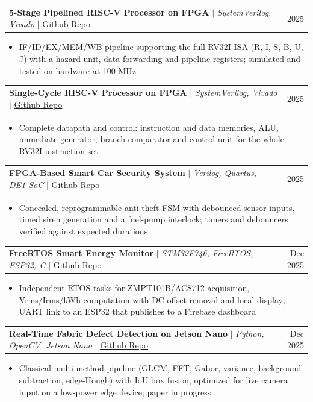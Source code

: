 \documentclass[letterpaper,11pt]{article}
\makeatletter
\newcommand{\resumeItem}[1]{
  \item\small{
    {#1 \vspace{-2pt}}
  }
}
\newcommand{\resumeProjectHeading}[2]{
    \item
    \begin{tabular*}{0.97\textwidth}{l@{\extracolsep{\fill}}r}
      \small#1 & #2 \\
    \end{tabular*}\vspace{-7pt}
}
\newcommand{\resumeItemListStart}{\begin{itemize}}
\newcommand{\resumeItemListEnd}{\end{itemize}\vspace{-5pt}}
\makeatother
\begin{document}
      \resumeProjectHeading
          {\textbf{5-Stage Pipelined RISC-V Processor on FPGA} $|$ \emph{SystemVerilog, Vivado} $|$ \href{https://github.com/Awais-Asghar/5-Stage-Pipelined-RISC-V-Processor-on-FPGA}{\underline{Github Repo}}}{2025}
          \resumeItemListStart
            \resumeItem{IF/ID/EX/MEM/WB pipeline supporting the full RV32I ISA (R, I, S, B, U, J) with a hazard unit, data forwarding and pipeline registers; simulated and tested on hardware at 100 MHz}
          \resumeItemListEnd

      \resumeProjectHeading
          {\textbf{Single-Cycle RISC-V Processor on FPGA} $|$ \emph{SystemVerilog, Vivado} $|$ \href{https://github.com/Awais-Asghar/Single-Cycle-RISC-V-Processor-Implemented-on-FPGA}{\underline{Github Repo}}}{2025}
          \resumeItemListStart
            \resumeItem{Complete datapath and control: instruction and data memories, ALU, immediate generator, branch comparator and control unit for the whole RV32I instruction set}
          \resumeItemListEnd

      \resumeProjectHeading
          {\textbf{FPGA-Based Smart Car Security System} $|$ \emph{Verilog, Quartus, DE1-SoC} $|$ \href{https://github.com/Awais-Asghar/FPGA-Based-Smart-Car-Security-System}{\underline{Github Repo}}}{2025}
          \resumeItemListStart
            \resumeItem{Concealed, reprogrammable anti-theft FSM with debounced sensor inputs, timed siren generation and a fuel-pump interlock; timers and debouncers verified against expected durations}
          \resumeItemListEnd

      \resumeProjectHeading
          {\textbf{FreeRTOS Smart Energy Monitor} $|$ \emph{STM32F746, FreeRTOS, ESP32, C} $|$ \href{https://github.com/Awais-Asghar/FreeRTOS-Based-Smart-Energy-Monitor-using-STM32}{\underline{Github Repo}}}{Dec 2025}
          \resumeItemListStart
            \resumeItem{Independent RTOS tasks for ZMPT101B/ACS712 acquisition, Vrms/Irms/kWh computation with DC-offset removal and local display; UART link to an ESP32 that publishes to a Firebase dashboard}
          \resumeItemListEnd

      \resumeProjectHeading
          {\textbf{Real-Time Fabric Defect Detection on Jetson Nano} $|$ \emph{Python, OpenCV, Jetson Nano} $|$ \href{https://github.com/Awais-Asghar/Real-Time-Fabric-Defect-Detection-on-Jetson-Nano}{\underline{Github Repo}}}{Dec 2025}
          \resumeItemListStart
            \resumeItem{Classical multi-method pipeline (GLCM, FFT, Gabor, variance, background subtraction, edge-Hough) with IoU box fusion, optimized for live camera input on a low-power edge device; paper in progress}
          \resumeItemListEnd
\end{document}
